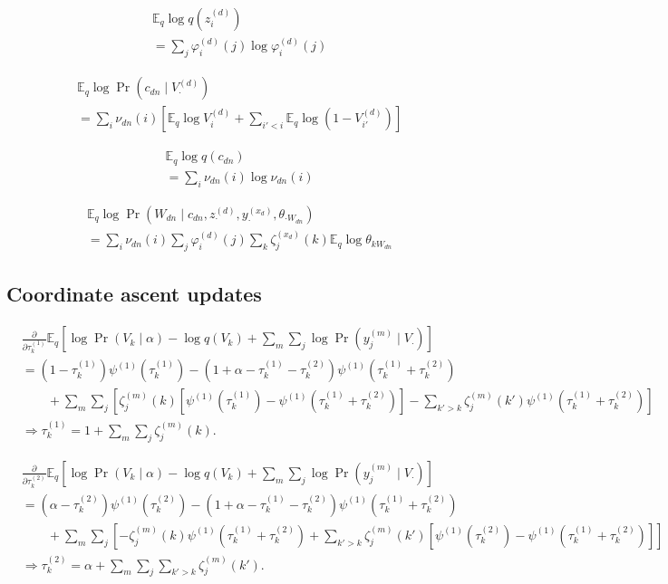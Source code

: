 \documentclass{article}
\newcommand{\trigamma}[1]{\ensuremath{\psi^{(1)}\left(#1\right)}}
\newcommand{\Eq}{\ensuremath{\mathbb{E}_q\xspace}}
\newcommand{\pd}[1]{\ensuremath{\frac{\partial}{\partial #1}}}
\begin{document}
\begin{align*}
    &\Eq \log q(z_i^{(d)}) \\
    &= \sum_j \varphi_i^{(d)}(j) \log \varphi_i^{(d)}(j)
\end{align*}

\begin{align*}
    &\Eq \log \Pr(c_{dn} \mid V^{(d)}_\cdot) \\
    &= \sum_i \nu_{dn}(i) \left[ \Eq \log V^{(d)}_i + \sum_{i'<i} \Eq \log (1-V^{(d)}_{i'}) \right]
\end{align*}

\begin{align*}
    &\Eq \log q(c_{dn}) \\
    &= \sum_i \nu_{dn}(i) \log \nu_{dn}(i)
\end{align*}

\begin{align*}
    &\Eq \log \Pr\left(W_{dn} \mid c_{dn}, z_\cdot^{(d)}, y_\cdot^{(x_d)}, \theta_{\cdot W_{dn}}\right) \\
    &= \sum_i \nu_{dn}(i) \sum_j \varphi_i^{(d)}(j) \sum_k \zeta_j^{(x_d)}(k) \Eq \log \theta_{k W_{dn}}
\end{align*}

\subsection*{Coordinate ascent updates}

\begin{align*}
    &\pd{\tau_{k}^{(1)}} \Eq \left[ \log \Pr(V_k \mid \alpha) - \log q(V_k) + \sum_m \sum_j \log \Pr(y_j^{(m)} \mid V_\cdot) \right] \\
    &= (1 - \tau^{(1)}_k) \trigamma{\tau^{(1)}_k} - (1 + \alpha - \tau^{(1)}_k - \tau^{(2)}_k) \trigamma{\tau^{(1)}_k + \tau^{(2)}_k} \\
    &\qquad + \sum_m \sum_j \left[ \zeta_j^{(m)}(k) \left[ \trigamma{\tau_{k}^{(1)}} - \trigamma{\tau_{k}^{(1)} + \tau_{k}^{(2)}} \right]
        - \sum_{k' > k} \zeta_j^{(m)}(k') \trigamma{\tau_{k}^{(1)} + \tau_{k}^{(2)}} \right] \\
    &\Rightarrow
    \boxed{ \tau^{(1)}_k = 1 + \sum_m \sum_j \zeta^{(m)}_j(k) }.
\end{align*}

\begin{align*}
    &\pd{\tau_{k}^{(2)}} \Eq \left[ \log \Pr(V_k \mid \alpha) - \log q(V_k) + \sum_m \sum_j \log \Pr(y_j^{(m)} \mid V_\cdot) \right] \\
    &= (\alpha - \tau^{(2)}_k) \trigamma{\tau^{(2)}_k} - (1 + \alpha - \tau^{(1)}_k - \tau^{(2)}_k) \trigamma{\tau^{(1)}_k + \tau^{(2)}_k} \\
    &\qquad + \sum_m \sum_j \left[ - \zeta_j^{(m)}(k) \trigamma{\tau_{k}^{(1)} + \tau_{k}^{(2)}}
        + \sum_{k' > k} \zeta_j^{(m)}(k') \left[ \trigamma{\tau_{k}^{(2)}} - \trigamma{\tau_{k}^{(1)} + \tau_{k}^{(2)}} \right] \right] \\
    &\Rightarrow
    \boxed{ \tau^{(2)}_k = \alpha + \sum_m \sum_j \sum_{k' > k} \zeta^{(m)}_j(k') }.
\end{align*}
\end{document}
